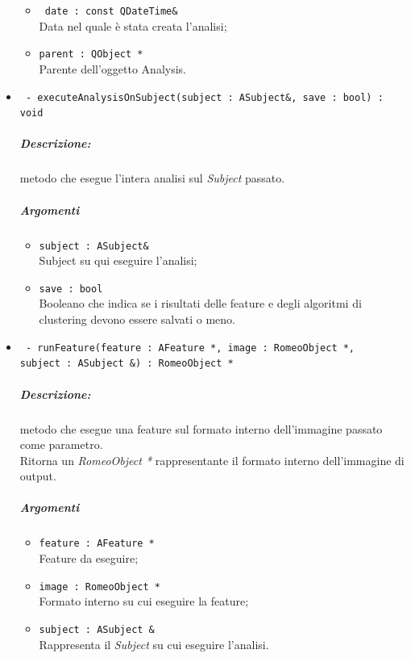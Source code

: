 \begin{itemize}
\begin{itemize}
				\item \color{RoyalPurple}\verb! date : const QDateTime&!\\
				\color{black}Data nel quale è stata creata l'analisi;
				
				\item \color{RoyalPurple}\verb!parent : QObject *!\\
				\color{black}Parente dell'oggetto Analysis.
			\end{itemize}
			
	\item \color{blue}\verb! - executeAnalysisOnSubject(subject : ASubject&, save : bool) : void!\\
	\color{black}\subparagraph{Descrizione:} metodo che esegue l'intera analisi sul \textsl{Subject} passato.
	\subparagraph{Argomenti}
		\begin{itemize}
			\item \color{RoyalPurple}\verb!subject : ASubject&!\\
			\color{black}Subject su qui eseguire l'analisi;
			
			\item \color{RoyalPurple}\verb!save : bool!\\
			\color{black}Booleano che indica se i risultati delle feature\g{} e degli algoritmi di clustering\g{} devono essere salvati o meno.
		\end{itemize}
	
	\item \color{blue}\verb! - runFeature(feature : AFeature *, image : RomeoObject *, !\\
	                            \verb!subject : ASubject &) : RomeoObject *!\\
	\color{black}\subparagraph{Descrizione:} metodo che esegue una feature\g{} sul formato interno dell'immagine passato come parametro.
	\\Ritorna un \textsl{RomeoObject *} rappresentante il formato interno dell'immagine di output.
	\subparagraph{Argomenti}
		\begin{itemize}
			\item \color{RoyalPurple}\verb!feature : AFeature *!\\
			\color{black}Feature da eseguire;
			
			\item \color{RoyalPurple}\verb!image : RomeoObject *!\\
			\color{black}Formato interno su cui eseguire la feature\g{};
			
			\item \color{RoyalPurple}\verb!subject : ASubject &!\\
			\color{black}Rappresenta il \textsl{Subject} su cui eseguire l'analisi.
		\end{itemize}
		

\end{itemize}
